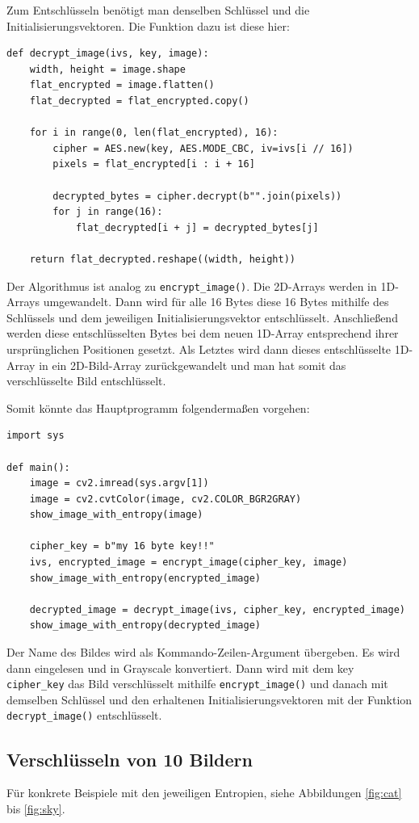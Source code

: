 Zum Entschlüsseln benötigt man denselben Schlüssel und die Initialisierungsvektoren. Die Funktion dazu ist diese hier:
\begin{lstlisting}
def decrypt_image(ivs, key, image):
    width, height = image.shape
    flat_encrypted = image.flatten()
    flat_decrypted = flat_encrypted.copy()

    for i in range(0, len(flat_encrypted), 16):
        cipher = AES.new(key, AES.MODE_CBC, iv=ivs[i // 16])
        pixels = flat_encrypted[i : i + 16]

        decrypted_bytes = cipher.decrypt(b"".join(pixels))
        for j in range(16):
            flat_decrypted[i + j] = decrypted_bytes[j]

    return flat_decrypted.reshape((width, height))
\end{lstlisting}
Der Algorithmus ist analog zu \lstinline{encrypt_image()}. Die 2D-Arrays werden in 1D-Arrays umgewandelt. Dann wird für alle
16 Bytes diese 16 Bytes mithilfe des Schlüssels und dem jeweiligen Initialisierungsvektor entschlüsselt. Anschließend werden diese entschlüsselten Bytes
bei dem neuen 1D-Array entsprechend ihrer ursprünglichen Positionen gesetzt. Als Letztes wird dann dieses entschlüsselte 1D-Array
in ein 2D-Bild-Array zurückgewandelt und man hat somit das verschlüsselte Bild entschlüsselt.

Somit könnte das Hauptprogramm folgendermaßen vorgehen:
\begin{lstlisting}
import sys

def main():
    image = cv2.imread(sys.argv[1])
    image = cv2.cvtColor(image, cv2.COLOR_BGR2GRAY)
    show_image_with_entropy(image)

    cipher_key = b"my 16 byte key!!"
    ivs, encrypted_image = encrypt_image(cipher_key, image)
    show_image_with_entropy(encrypted_image)

    decrypted_image = decrypt_image(ivs, cipher_key, encrypted_image)
    show_image_with_entropy(decrypted_image)
\end{lstlisting}
Der Name des Bildes wird als Kommando-Zeilen-Argument übergeben. Es wird dann eingelesen und in Grayscale konvertiert.
Dann wird mit dem key \lstinline{cipher_key} das Bild verschlüsselt mithilfe \lstinline{encrypt_image()} und danach
mit demselben Schlüssel und den erhaltenen Initialisierungsvektoren mit der Funktion \lstinline{decrypt_image()} entschlüsselt.

\subsection{Verschlüsseln von 10 Bildern}
Für konkrete Beispiele mit den jeweiligen Entropien, siehe Abbildungen \ref{fig:cat} bis \ref{fig:sky}.

